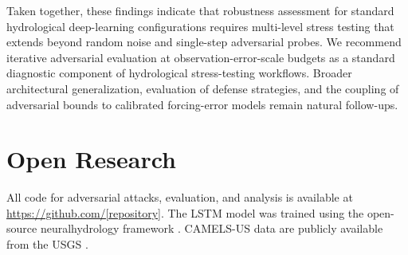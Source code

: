 \documentclass[final]{agujournal2019}
\begin{document}
Taken together, these findings indicate that robustness assessment for standard hydrological deep-learning configurations requires multi-level stress testing that extends beyond random noise and single-step adversarial probes. We recommend iterative adversarial evaluation at observation-error-scale budgets as a standard diagnostic component of hydrological stress-testing workflows. Broader architectural generalization, evaluation of defense strategies, and the coupling of adversarial bounds to calibrated forcing-error models remain natural follow-ups.

\section*{Open Research}
All code for adversarial attacks, evaluation, and analysis is available at \url{https://github.com/[repository]}. The LSTM model was trained using the open-source neuralhydrology framework \cite{Kratzert2022}. CAMELS-US data are publicly available from the USGS \cite{Newman2015, Addor2017}.



\end{document}
